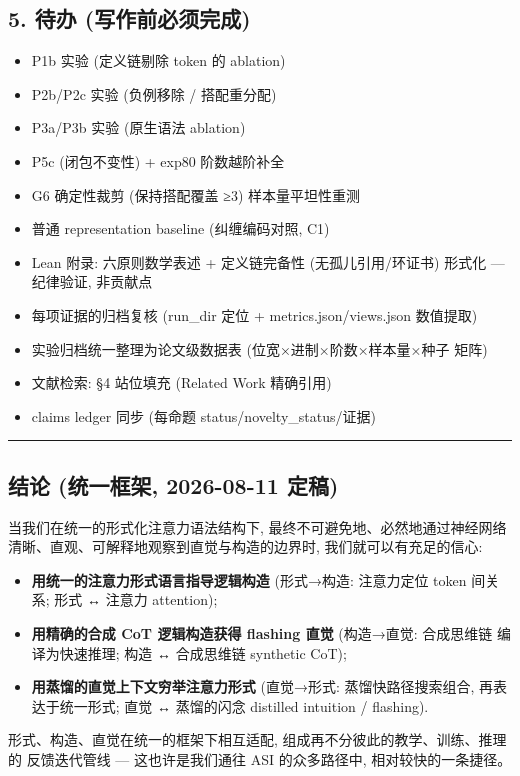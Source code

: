 \documentclass[
]{article}
\providecommand{\tightlist}{%
  \setlength{\itemsep}{0pt}\setlength{\parskip}{0pt}}
\begin{document}
\subsection{5. 待办
(写作前必须完成)}\label{ux5f85ux529e-ux5199ux4f5cux524dux5fc5ux987bux5b8cux6210}

\begin{itemize}
\tightlist
\item[$\square$]
  P1b 实验 (定义链剔除 token 的 ablation)
\item[$\square$]
  P2b/P2c 实验 (负例移除 / 搭配重分配)
\item[$\square$]
  P3a/P3b 实验 (原生语法 ablation)
\item[$\square$]
  P5c (闭包不变性) + exp80 阶数越阶补全
\item[$\square$]
  G6 确定性裁剪 (保持搭配覆盖 ≥3) 样本量平坦性重测
\item[$\square$]
  普通 representation baseline (纠缠编码对照, C1)
\item[$\square$]
  Lean 附录: 六原则数学表述 + 定义链完备性 (无孤儿引用/环证书) 形式化
  --- 纪律验证, 非贡献点
\item[$\square$]
  每项证据的归档复核 (run\_dir 定位 + metrics.json/views.json 数值提取)
\item[$\square$]
  实验归档统一整理为论文级数据表 (位宽×进制×阶数×样本量×种子 矩阵)
\item[$\square$]
  文献检索: §4 站位填充 (Related Work 精确引用)
\item[$\square$]
  claims ledger 同步 (每命题 status/novelty\_status/证据)
\end{itemize}

\begin{center}\rule{0.5\linewidth}{0.5pt}\end{center}

\subsection{结论 (统一框架, 2026-08-11
定稿)}\label{ux7ed3ux8bba-ux7edfux4e00ux6846ux67b6-2026-08-11-ux5b9aux7a3f}

当我们在统一的形式化注意力语法结构下, 最终不可避免地、必然地通过神经网络
清晰、直观、可解释地观察到直觉与构造的边界时, 我们就可以有充足的信心:

\begin{itemize}
\tightlist
\item
  \textbf{用统一的注意力形式语言指导逻辑构造} (形式→构造: 注意力定位
  token 间关系; 形式 ↔ 注意力 attention);
\item
  \textbf{用精确的合成 CoT 逻辑构造获得 flashing 直觉} (构造→直觉:
  合成思维链 编译为快速推理; 构造 ↔ 合成思维链 synthetic CoT);
\item
  \textbf{用蒸馏的直觉上下文穷举注意力形式} (直觉→形式:
  蒸馏快路径搜索组合, 再表达于统一形式; 直觉 ↔ 蒸馏的闪念 distilled
  intuition / flashing).
\end{itemize}

形式、构造、直觉在统一的框架下相互适配,
组成再不分彼此的教学、训练、推理的 反馈迭代管线 --- 这也许是我们通往 ASI
的众多路径中, 相对较快的一条捷径。
\end{document}
